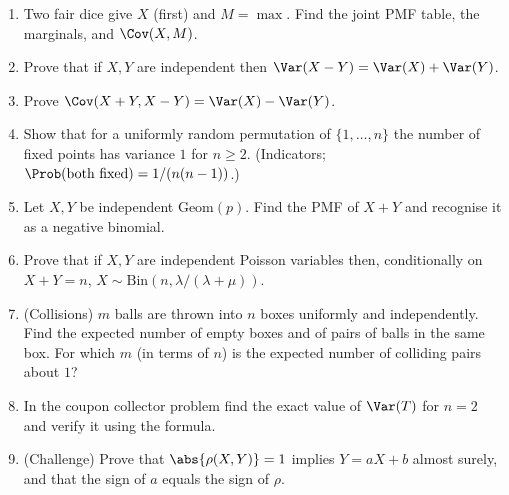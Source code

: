 \begin{enumerate}
\item Two fair dice give $X$ (first) and $M=\max$. Find the joint PMF table, the
marginals, and $\Cov(X,M)$.
\item Prove that if $X,Y$ are independent then
$\Var(X-Y)=\Var(X)+\Var(Y)$.
\item Prove $\Cov(X+Y,X-Y)=\Var(X)-\Var(Y)$.
\item Show that for a uniformly random permutation of $\{1,\dots,n\}$ the number
of fixed points has variance $1$ for $n\ge2$. (Indicators; $\Prob(\text{both
fixed})=1/(n(n-1))$.)
\item Let $X,Y$ be independent Geom$(p)$. Find the PMF of $X+Y$ and recognise it
as a negative binomial.
\item Prove that if $X,Y$ are independent Poisson variables then, conditionally on
$X+Y=n$, $X\sim\mathrm{Bin}(n,\lambda/(\lambda+\mu))$.
\item (Collisions) $m$ balls are thrown into $n$ boxes uniformly and
independently. Find the expected number of empty boxes and of pairs of balls in
the same box. For which $m$ (in terms of $n$) is the expected number of colliding
pairs about $1$?
\item In the coupon collector problem find the exact value of $\Var(T)$ for $n=2$
and verify it using the formula.
\item (Challenge) Prove that $\abs{\rho(X,Y)}=1$ implies $Y=aX+b$ almost surely,
and that the sign of $a$ equals the sign of $\rho$.
\end{enumerate}
